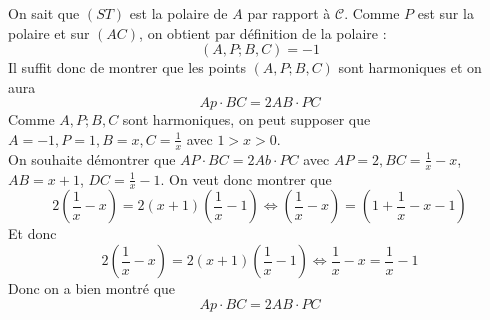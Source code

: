 On sait que $(ST)$ est la polaire de $A$ par rapport à $\mathcal{C}$. Comme $P$ est sur la polaire et sur $(AC)$, on obtient par définition de la polaire :
$$(A, P; B, C)=-1 $$
Il suffit donc de montrer que les points $(A, P; B, C)$ sont harmoniques et on aura
$$Ap\cdot BC = 2AB\cdot PC $$
Comme $A, P; B, C$ sont harmoniques, on peut supposer que $A=-1, P=1, B=x, C=\frac{1}{x}$ avec $1>x>0$.
\\
On souhaite démontrer que $AP\cdot BC=2Ab\cdot PC$ avec $AP=2, BC=\frac{1}{x}-x$, $AB=x+1$, $DC=\frac{1}{x}-1$. On veut donc montrer que
$$2\left(\frac{1}{x}-x\right)=2(x+1)\left(\frac{1}{x}-1\right) \iff \left(\frac{1}{x}-x\right)=\left(1+\frac{1}{x}-x-1\right) $$
Et donc
$$2\left(\frac{1}{x}-x\right)=2(x+1)\left(\frac{1}{x}-1\right) \iff \frac{1}{x}-x=\frac{1}{x}-1$$
Donc on a bien montré que
$$Ap\cdot BC=2AB\cdot PC $$
